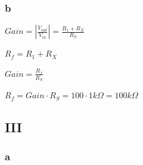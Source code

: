 \documentclass[10pt]{article}
\begin{document}
\subsubsection*{b}
{\doublespacing
\noindent $Gain = |\frac{V_{out}}{V_{in}}| = \frac{R_1+R_X}{R_S}$

\noindent $R_f = R_1 + R_X$

\noindent $Gain = \frac{R_f}{R_S}$

\noindent $R_f = Gain\cdot R_S = 100 \cdot 1k\Omega = 100k\Omega$}

\subsection*{III}
\subsubsection*{a}
\end{document}
